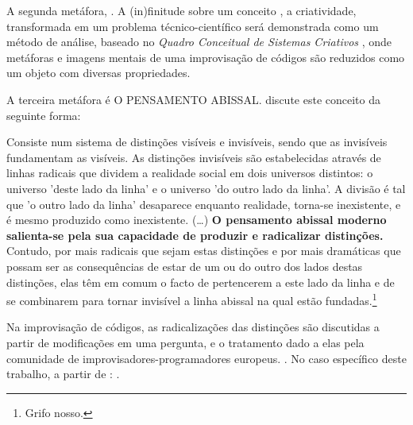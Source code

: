 A segunda metáfora,  \cite[p.~15]{santos_filosofia_2008}. A (in)finitude sobre um conceito , a criatividade, transformada em um problema técnico-científico será demonstrada como um método de análise, baseado no \emph{Quadro Conceitual de Sistemas Criativos} \cite{mclean_music_2006,Forth2010}, onde metáforas e imagens mentais de uma improvisação de códigos são reduzidos como um objeto com diversas propriedades. 

A terceira metáfora é \MakeTextUppercase{o pensamento abissal}.  discute este conceito da seguinte forma:

\begin{citacao}
Consiste num sistema de distinções visíveis e invisíveis, sendo que as invisíveis fundamentam as visíveis. As distinções invisíveis são estabelecidas através de linhas radicais que dividem a realidade social em dois universos distintos: o universo  'deste lado da linha' e o universo 'do outro lado da linha'. A divisão é tal que 'o outro lado da linha' desaparece enquanto realidade, torna-se inexistente, e é mesmo produzido como inexistente. (\ldots) \textbf{O pensamento abissal moderno salienta-se pela sua capacidade de produzir e radicalizar distinções.} Contudo, por mais radicais que sejam estas distinções e por mais dramáticas que possam ser as consequências de estar de um ou do outro dos lados destas distinções, elas têm em comum o facto de pertencerem a este lado da linha e de se combinarem para tornar invisível a linha abissal na qual estão fundadas.\footnote{Grifo nosso.} 
\end{citacao}

Na improvisação de códigos, as radicalizações das distinções são discutidas a partir de modificações em uma pergunta, e o tratamento dado a elas pela comunidade de improvisadores-programadores europeus. \cite{pressing_improvisation_1987}. No caso específico deste trabalho, a partir de : . 

